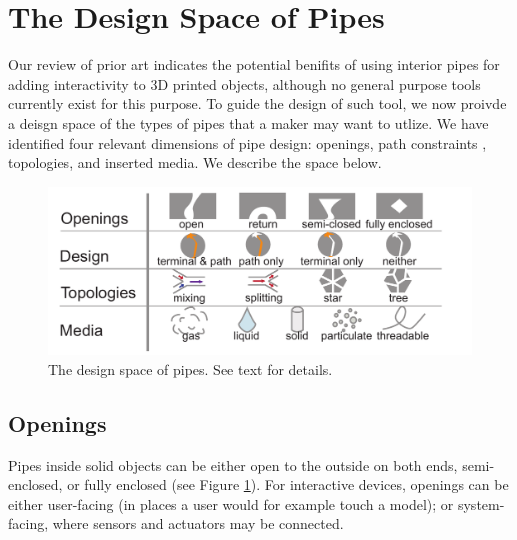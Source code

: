
\section{The Design Space of Pipes}
Our review of prior art indicates the potential benifits of using interior pipes for adding interactivity to 3D printed objects, although no general purpose tools currently exist for this purpose. To guide the design of such tool, we now proivde a deisgn space of the types of pipes that a maker may want to utlize. We have identified four relevant dimensions of pipe design: openings, path constraints , topologies, and inserted media.  We describe the space below.

\begin{figure}[t]
\centering
    \includegraphics[width=1.0\columnwidth]{figures/tubespace.pdf}
\caption{The design space of pipes.  See text for details.  }
\label{fig:pipespace}
\end{figure}

\subsection{Openings}
Pipes inside solid objects can be either open to the outside on both ends, semi-enclosed, or fully enclosed (see Figure \ref{fig:pipespace}). For interactive devices, openings can be either user-facing (in places a user would for example touch a model); or system-facing, where sensors and actuators may be connected.

